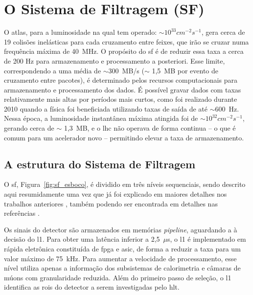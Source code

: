 \section{O Sistema de Filtragem (SF)}
\label{sec:sf}

O \gls{atlas}, para a luminosidade na qual tem operado: $\sim10^{33}cm^{-2}s^{-1}$,
gera cerca de 19 colisões inelásticas para cada cruzamento entre
feixes, que irão se cruzar numa frequência máxima de 40~MHz. O propósito do
\gls{sf} \cite{trigger_perf_2010,trigger_tdr} é de reduzir essa taxa a cerca
de 200 Hz para armazenamento e processamento a posteriori. Esse
limite, correspondendo a uma média de $\sim$300~MB/s ($\sim$ 1,5~MB por evento de
cruzamento entre pacotes), é determinado pelos recursos
computacionais para armazenamento e processamento dos dados. É possível gravar
dados com taxas relativamente mais altas por períodos mais curtos, como foi
realizado durante 2010 quando a física foi beneficiada utilizando taxas de saída
de até $\sim$600~Hz. Nessa época, a luminosidade instantânea máxima atingida foi de
$\sim10^{32}cm^{-2}s^{-1}$, gerando cerca de $\sim$ 1,3~MB, e o \gls{lhc} não 
operava de forma continua -- o que é comum para um acelerador novo -- permitindo 
elevar a taxa de armazenamento.

\subsection{A estrutura do Sistema de Filtragem}
\label{ssec:estru_sf}

O \gls{sf}, Figura~\ref{fig:sf_esboco}, é dividido em três níveis sequenciais,
sendo descrito aqui resumidamente uma vez que já foi explicado em maiores detalhes nos
trabalhos anteriores \cite{tese_torres,tese_eduardo}, também podendo ser encontrada 
em detalhes nas referências \cite{trigger_tdr,l1_trigger_tdr,l2_ef_daq_dcs_tdr,trigger_perfomance}.

Os sinais do detector são armazenados em memórias \emph{pipeline}, aguardando a
à decisão do \acrshort{l1}. Para obter uma latência inferior a 2,5~$\mu$s, 
o \gls{l1} é implementado em rápida eletrônica constituída de \gls{fpga} e
\gls{asic}, de forma a reduzir a taxa para um valor máximo de 75~kHz. Para
aumentar a velocidade de processamento, esse nível utiliza apenas a informação dos subsistemas de
calorimetria e câmaras de múons com granularidade reduzida. Além do
primeiro passo de seleção, o \gls{l1} identifica as \glspl{roi} do detector a
serem investigadas pelo \acrshort{hlt}. 

